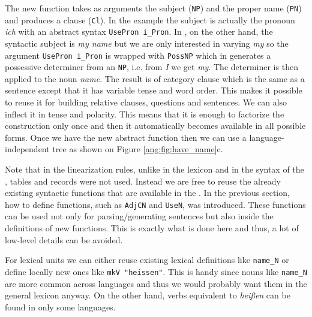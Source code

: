 \documentclass[output=paper]{langsci/langscibook}
\begin{document}
The new function takes as arguments the subject (\verb=NP=) and 
the proper name (\verb=PN=) and produces a clause (\verb=Cl=).
In the  example the subject is actually the pronoun \textit{ich}
with an abstract syntax \verb=UsePron i_Pron=. In , on the
other hand, the syntactic subject is \textit{my name} but we are only
interested in varying \textit{my} so the argument \verb=UsePron i_Pron=
is wrapped with \verb=PossNP= which in  generates a possessive determiner
from an \verb=NP=, i.e. from \textit{I} we get \textit{my}. The determiner
is then applied to the noun \textit{name}.
The result is of category clause which is the same as a sentence except that it has 
variable tense and word order. This makes it possible to reuse it for building 
relative clauses, questions and sentences. We can also inflect it 
in tense and polarity. This means that it is enough to factorize 
the construction only once and then it automatically becomes available 
in all possible forms. Once we have the new abstract function then 
we can use a language-independent tree as shown on Figure \ref{ang:fig:have_name}c.

Note that in the linearization rules, unlike in the lexicon and in the syntax of the , tables and records were not used. 
Instead we are free to reuse the already existing syntactic functions 
that are available in the . In the previous section, 
how to define functions, such as \verb=AdjCN= and \verb=UseN=, was introduced. These functions can be used not only for parsing/generating sentences but also inside the definitions of new functions. This is exactly what is done here and thus, a lot of low-level details can be avoided.

For lexical units we can either reuse existing lexical definitions 
like \verb=name_N= or define locally new ones like \verb=mkV "heissen"=.
This is handy since nouns like \verb=name_N= are more common across 
languages and thus we would probably want them in 
the general lexicon anyway. On the other hand, verbs equivalent to 
\textit{hei{\ss}en} can be found in only some languages.
\end{document}
